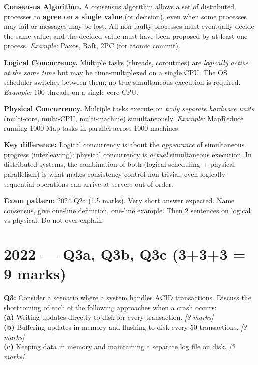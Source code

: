 \documentclass[12pt,a4paper]{article}
\begin{document}
\begin{solbox}
\textbf{Consensus Algorithm.}
A consensus algorithm allows a set of distributed processes to \textbf{agree on a single value}
(or decision), even when some processes may fail or messages may be lost.
All non-faulty processes must eventually decide the same value, and the decided value
must have been proposed by at least one process.
\textit{Example:} Paxos, Raft, 2PC (for atomic commit).

\medskip
\textbf{Logical Concurrency.}
Multiple tasks (threads, coroutines) are \emph{logically active at the same time} but
may be time-multiplexed on a single CPU.
The OS scheduler switches between them; no true simultaneous execution is required.
\textit{Example:} 100 threads on a single-core CPU.

\medskip
\textbf{Physical Concurrency.}
Multiple tasks execute on \emph{truly separate hardware units} (multi-core, multi-CPU,
multi-machine) simultaneously.
\textit{Example:} MapReduce running 1000 Map tasks in parallel across 1000 machines.

\medskip
\textbf{Key difference:}
Logical concurrency is about the \emph{appearance} of simultaneous progress (interleaving);
physical concurrency is \emph{actual} simultaneous execution.
In distributed systems, the combination of both (logical scheduling + physical parallelism)
is what makes consistency control non-trivial: even logically sequential operations can
arrive at servers out of order.
\end{solbox}

\begin{notesbox}
\textbf{Exam pattern:} 2024 Q2a (1.5 marks). Very short answer expected.
Name consensus, give one-line definition, one-line example. Then 2 sentences on
logical vs physical. Do not over-explain.
\end{notesbox}

\newpage
\section{2022 — Q3a, Q3b, Q3c (3+3+3 = 9 marks)}

\begin{qbox}
\textbf{Q3:} Consider a scenario where a system handles ACID transactions.
Discuss the shortcoming of each of the following approaches when a crash occurs:\\
\textbf{(a)} Writing updates directly to disk for every transaction. \hfill\textit{[3 marks]}\\
\textbf{(b)} Buffering updates in memory and flushing to disk every 50 transactions. \hfill\textit{[3 marks]}\\
\textbf{(c)} Keeping data in memory and maintaining a separate log file on disk. \hfill\textit{[3 marks]}
\end{qbox}
\end{document}

